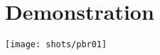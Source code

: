 \section{Demonstration}
\begin{frame}
  \sectionpage
  \centering
  \texttt{[image: shots/pbr01]}
\end{frame}

